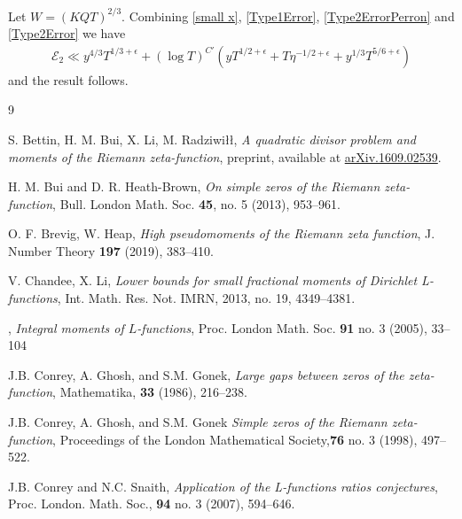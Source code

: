 \documentclass[oneside, 12pt]{amsart}
\theoremstyle{definition}
\begin{document}
Let $W=(KQT)^{2/3}$. Combining \eqref{small x}, \eqref{Type1Error}, \eqref{Type2ErrorPerron} and \eqref{Type2Error} we have 
\begin{align*}
\mathcal{E}_2\ll y^{4/3} T^{1/3+\epsilon}+ (\log T)^{C'}\left( yT^{1/2+\epsilon}+ T\eta^{-1/2+\epsilon}+y^{1/3}T^{5/6+\epsilon}\right)
\end{align*}
and the result follows.






\begin{thebibliography}{9}



S. Bettin, H. M. Bui, X. Li, M. Radziwi\l\l, \emph{A quadratic divisor problem and moments of the Riemann
zeta-function}, preprint, available at \href{http://arxiv.org/abs/1609.02539}{arXiv.1609.02539}.



H. M. Bui and D. R. Heath-Brown, \emph{On simple zeros of the Riemann zeta-function}, Bull. London Math. Soc. {\bf 45}, no. 5 (2013), 953--961.



O. F. Brevig, W. Heap, \emph{High pseudomoments of the Riemann zeta function}, J. Number Theory {\bf 197} (2019), 383--410.



V. Chandee, X. Li, \emph{Lower bounds for small fractional moments of Dirichlet L-functions}, Int. Math. Res. Not. IMRN,
2013, no. 19, 4349--4381.



, \emph{Integral moments of $L$-functions}, {Proc. London Math. Soc.} {\bf 91} no. 3 (2005), 33--104


J.B. Conrey, A. Ghosh, and S.M. Gonek, \emph{Large gaps between zeros of the zeta-function}, Mathematika, {\bf 33} (1986), 216--238.



 J.B. Conrey, A. Ghosh, and S.M. Gonek \emph{ Simple zeros of the Riemann zeta-function}, Proceedings of the London Mathematical Society,{\bf 76} no. 3 (1998), 497--522.


J.B. Conrey and N.C. Snaith, \emph{Application of the L-functions ratios conjectures}, Proc. London. Math. Soc., {\bf 94} no. 3 (2007), 594--646.




\end{thebibliography}
\end{document}
